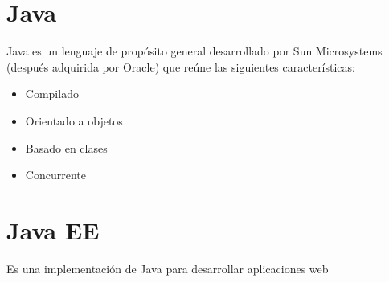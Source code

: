 \section{ Java }
Java es un lenguaje de propósito general desarrollado por Sun Microsystems (después adquirida por Oracle) que reúne las siguientes características:
\begin{itemize}
 \item Compilado
 \item Orientado a objetos
 \item Basado en clases
 \item Concurrente 
\end{itemize}

\section{ Java EE }
Es una implementación de Java para desarrollar aplicaciones web